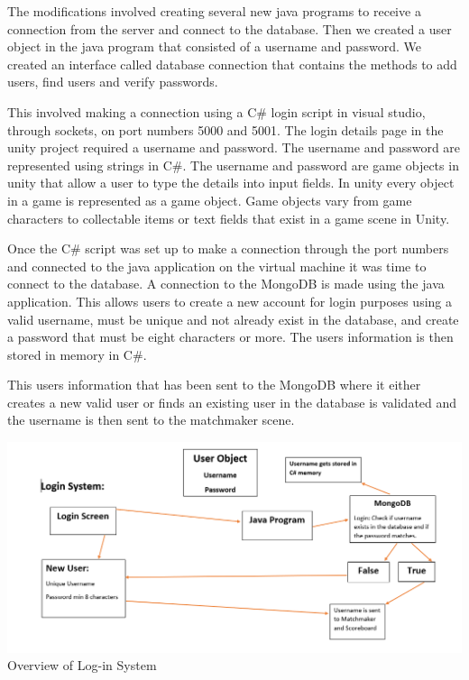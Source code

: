 The modifications involved creating several new java programs to receive a connection from the server and connect to the database. Then we created a user object in the java program that consisted of a username and password. We created an interface called database connection that contains the methods to add users, find users and verify passwords.\newline

This involved making a connection using a C\# login script in visual studio, through sockets, on port numbers 5000 and 5001. The login details page in the unity project required a username and password. The username and password are represented using strings in C\#. The username and password are game objects in unity that allow a user to type the details into input fields. In unity every object in a game is represented as a game object. Game objects vary from game characters to collectable items or text fields that exist in a game scene in Unity.\newline

Once the C\# script was set up to make a connection through the port numbers and connected to the java application on the virtual machine it was time to connect to the database. A connection to the MongoDB is made using the java application. This allows users to create a new account for login purposes using a valid username, must be unique and not already exist in the database, and create a password that must be eight characters or more. The users information is then stored in memory in C\#.\newline

This users information that has been sent to the MongoDB where it either creates a new valid user or finds an existing user in the database is validated and the username is then sent to the matchmaker scene.\newline
\cite{S073658531830140020180801}


\includegraphics[width=1\columnwidth]{img/LoginSystem.PNG}
Overview of Log-in System

